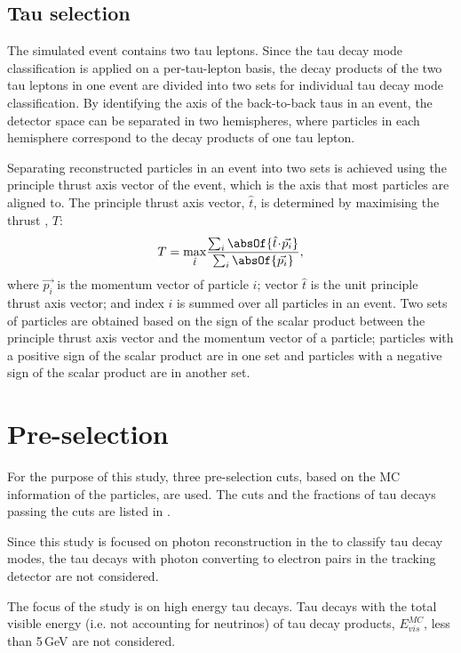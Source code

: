 \subsection{Tau selection}

The simulated \eeToTauTau event contains two tau leptons. Since the tau decay mode classification is applied on a per-tau-lepton basis, the decay products of the two tau leptons in one event are divided into two sets for individual tau decay mode classification. By identifying the axis of the back-to-back taus in an event, the detector space can be separated in two hemispheres, where particles in each hemisphere correspond to the decay products of one tau lepton.

Separating reconstructed particles in an event into two sets is achieved using the principle thrust axis vector of the event, which is the axis that most particles are aligned to. The principle thrust axis vector, $\hat{t}$, is determined by maximising the thrust \cite{PhysRevLett.39.1587}, $T$:
\begin{equation}
T = \max_{\hat{t}}\!\frac{\sum_{i}\absOf{\hat{t}\!\cdot\!\vec{p_{i}}}}{\sum_{i}\absOf{\vec{p_{i}}}},
\end{equation}
where $\vec{p_{i}}$ is the momentum vector of particle $i$;  vector $\hat{t}$ is the unit principle thrust axis vector; and index $i$ is summed over all particles in an event. Two sets of particles are obtained based on the sign of the scalar product between the principle thrust axis vector  and the momentum vector of a particle; particles with a positive sign of the scalar product are in one set and particles with a negative sign of the scalar product are in another set.


\section{Pre-selection}
\label{sec:tauPreSel}


For the purpose of this study, three pre-selection cuts, based on the MC information of the particles,  are used. The cuts and the fractions of tau decays passing the cuts are listed in .

Since this study is focused on photon reconstruction in the \ECAL to classify tau decay modes, the tau decays with photon converting to electron pairs in the tracking detector are not considered.

The focus of the study is on high energy tau decays. Tau decays with the total visible energy (i.e. not accounting for neutrinos) of tau decay products, $E_{vis}^{MC}$, less than 5\,GeV are not considered.



